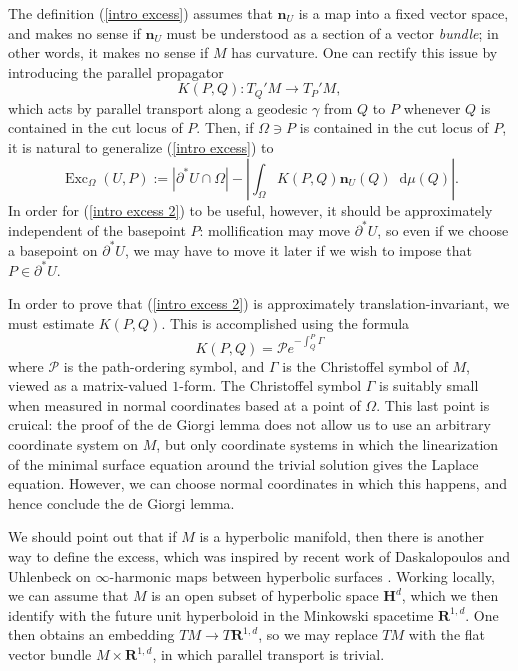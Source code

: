 \documentclass[reqno,11pt]{amsart}
\newcommand{\RR}{\mathbf{R}}
\newcommand{\Hyp}{\mathbf H}
\DeclareMathOperator{\Exc}{Exc}
\newcommand*\dif{\mathop{}\!\mathrm{d}}
\newcommand{\normal}{\mathbf n}
\theoremstyle{definition}
\numberwithin{equation}{section}
\begin{document}
The definition (\ref{intro excess}) assumes that $\normal_U$ is a map into a fixed vector space, and makes no sense if $\normal_U$ must be understood as a section of a vector \emph{bundle}; in other words, it makes no sense if $M$ has curvature.
One can rectify this issue by introducing the parallel propagator
$$K(P, Q): T_Q'M \to T_P'M,$$
which acts by parallel transport along a geodesic $\gamma$ from $Q$ to $P$ whenever $Q$ is contained in the cut locus of $P$.
Then, if $\Omega \ni P$ is contained in the cut locus of $P$, it is natural to generalize (\ref{intro excess}) to
\begin{equation}\label{intro excess 2}
\Exc_\Omega(U, P) := |\partial^* U \cap \Omega| - \left|\int_\Omega K(P, Q) \normal_U(Q) \dif \mu(Q)\right|.
\end{equation}
In order for (\ref{intro excess 2}) to be useful, however, it should be approximately independent of the basepoint $P$: mollification may move $\partial^* U$, so even if we choose a basepoint on $\partial^* U$, we may have to move it later if we wish to impose that $P \in \partial^* U$.

In order to prove that (\ref{intro excess 2}) is approximately translation-invariant, we must estimate $K(P, Q)$.
This is accomplished using the formula \cite[Chapter II, \S2]{baez1994gauge}
$$K(P, Q) = \mathcal Pe^{-\int_Q^P \Gamma}$$
where $\mathcal P$ is the path-ordering symbol, and $\Gamma$ is the Christoffel symbol of $M$, viewed as a matrix-valued $1$-form.
The Christoffel symbol $\Gamma$ is suitably small when measured in normal coordinates based at a point of $\Omega$.
This last point is cruical: the proof of the de Giorgi lemma does not allow us to use an arbitrary coordinate system on $M$, but only coordinate systems in which the linearization of the minimal surface equation around the trivial solution gives the Laplace equation.
However, we can choose normal coordinates in which this happens, and hence conclude the de Giorgi lemma.

We should point out that if $M$ is a hyperbolic manifold, then there is another way to define the excess, which was inspired by recent work of Daskalopoulos and Uhlenbeck on $\infty$-harmonic maps between hyperbolic surfaces \cite{daskalopoulosPrep1}.
Working locally, we can assume that $M$ is an open subset of hyperbolic space $\Hyp^d$, which we then identify with the future unit hyperboloid in the Minkowski spacetime $\RR^{1, d}$.
One then obtains an embedding $TM \to T\RR^{1, d}$, so we may replace $TM$ with the flat vector bundle $M \times \RR^{1, d}$, in which parallel transport is trivial.
\end{document}
